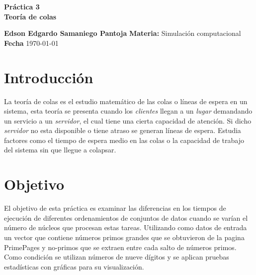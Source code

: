 \documentclass[a4paper, 11pt]{article}
\begin{document}
\begin{center}
\LARGE \bf Pr\'actica 3\\ Teoría de colas 
\end{center}

\vspace{1cm} 
\noindent\textbf {Edson Edgardo Samaniego Pantoja} \hfill \textbf{Materia:} Simulación computacional 
\hfill \\
\textbf{Fecha} \today  
\vspace{1cm} 

\section{Introducción}
La teoría de colas es el estudio matemático de las colas o líneas de espera en un sistema, esta teoría se presenta cuando los \textit{clientes} llegan a un \textit{lugar} demandando un servicio a un \textit{servidor}, el cual tiene una cierta capacidad de atención. Si dicho \textit{servidor} no esta disponible o tiene atraso se generan líneas de espera. Estudia factores como el tiempo de espera medio en las colas o la capacidad de trabajo del sistema sin que llegue a colapsar.

\section{Objetivo}
El objetivo de esta práctica es examinar las diferencias en los tiempos de ejecución de diferentes ordenamientos de conjuntos de datos cuando se varían el número de núcleos que procesan estas tareas. Utilizando como datos de entrada un vector que contiene números primos grandes que se obtuvieron de la pagina PrimePages \cite{primos} y no-primos que se extraen entre cada salto de números primos. Como condición se utilizan números de nueve dígitos y se aplican pruebas estadísticas con gráficas para su visualización.
\end{document}
